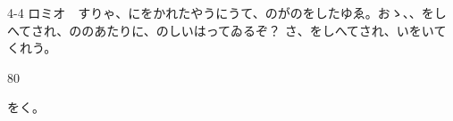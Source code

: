 \documentclass[tate,paper=b6j,jafontsize=9pt]{jlreq}
\begin{document}
\begin{azconvIndented}{4\zw}{-4\zw}
ロミオ　すりゃ、にをかれたやうにうて、のがのをしたゆゑ。おゝ、、をしへてされ、ののあたりに、のしいはってゐるぞ？ さ、をしへてされ、いをいてくれう。

\end{azconvIndented}
\begin{azconvIndented}{8\zw}{0\zw}

をく。

\end{azconvIndented}
\end{document}
